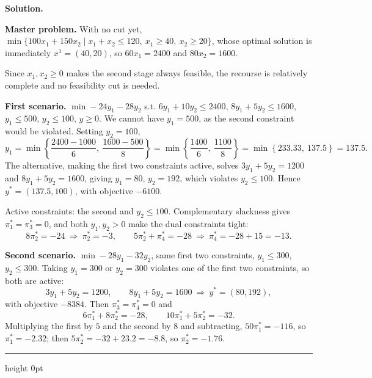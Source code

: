 \documentclass[11pt]{article}
\newenvironment{solution}
    {\par\nobreak\smallskip\noindent\textbf{Solution.}\par\nobreak\smallskip}
    {\par\medskip\hrule height 0pt\medskip}
\begin{document}
\begin{solution}
\textbf{Master problem.} With no cut yet,
$\min \lbrace 100x_1 + 150x_2 \mid x_1 + x_2 \leq 120,\ x_1 \geq 40,\ x_2 \geq 20 \rbrace$,
whose optimal solution is immediately $x^1 = (40, 20)$, so $60x_1 = 2400$ and
$80x_2 = 1600$.

Since $x_1, x_2 \geq 0$ makes the second stage always feasible, the recourse is
relatively complete and no feasibility cut is needed.

\textbf{First scenario.}
$\min -24y_1 - 28y_2$ s.t. $6y_1 + 10y_2 \leq 2400$, $8y_1 + 5y_2 \leq 1600$,
$y_1 \leq 500$, $y_2 \leq 100$, $y \geq 0$.
We cannot have $y_1 = 500$, as the second constraint would be violated.
Setting $y_2 = 100$,
\[
y_1 = \min\left\lbrace \frac{2400-1000}{6},\ \frac{1600-500}{8} \right\rbrace
= \min\left\lbrace \frac{1400}{6},\ \frac{1100}{8} \right\rbrace
= \min\left\lbrace 233.33,\ 137.5 \right\rbrace = 137.5 .
\]
The alternative, making the first two constraints active, solves
$3y_1 + 5y_2 = 1200$ and $8y_1 + 5y_2 = 1600$, giving $y_1 = 80$, $y_2 = 192$,
which violates $y_2 \leq 100$. Hence $y^* = (137.5, 100)$, with objective
$-6100$.

Active constraints: the second and $y_2 \leq 100$. Complementary slackness gives
$\pi_1^* = \pi_3^* = 0$, and both $y_1, y_2 > 0$ make the dual constraints tight:
\[
8\pi_2^* = -24 \ \Rightarrow\ \pi_2^* = -3,
\qquad
5\pi_2^* + \pi_4^* = -28 \ \Rightarrow\ \pi_4^* = -28 + 15 = -13 .
\]

\textbf{Second scenario.}
$\min -28y_1 - 32y_2$, same first two constraints, $y_1 \leq 300$, $y_2 \leq 300$.
Taking $y_1 = 300$ or $y_2 = 300$ violates one of the first two constraints, so
both are active:
\[
3y_1 + 5y_2 = 1200, \qquad 8y_1 + 5y_2 = 1600
\ \Longrightarrow\ y^* = (80, 192),
\]
with objective $-8384$. Then $\pi_3^* = \pi_4^* = 0$ and
\[
6\pi_1^* + 8\pi_2^* = -28, \qquad 10\pi_1^* + 5\pi_2^* = -32 .
\]
Multiplying the first by $5$ and the second by $8$ and subtracting,
$50\pi_1^* = -116$, so $\pi_1^* = -2.32$; then
$5\pi_2^* = -32 + 23.2 = -8.8$, so $\pi_2^* = -1.76$.


\end{solution}
\end{document}
